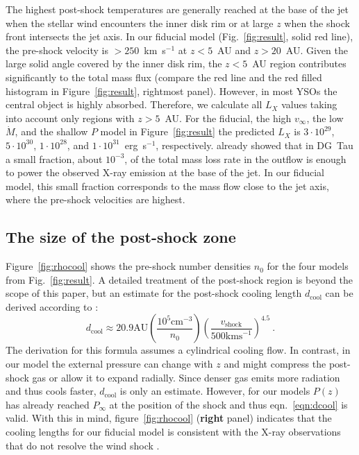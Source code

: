 \documentclass[manuscript]{aastex}
\begin{document}
The highest post-shock temperatures are generally reached at the base of the jet when the stellar wind encounters the inner disk rim or at large $z$ when the shock front intersects the jet axis. In our fiducial model (Fig.~\ref{fig:result}, solid red line), the pre-shock velocity is $>250$~km~s$^{-1}$ at $z<5$~AU and $z>20$~AU. Given the large solid angle covered by the inner disk rim, the  $z<5$~AU region contributes significantly to the total mass flux (compare the red line and the red filled histogram in Figure~\ref{fig:result}, rightmost panel). However, in most YSOs the central object is highly absorbed. Therefore, we calculate all $L_X$ values taking into account only regions with  $z>5$~AU. For the fiducial, the high $v_\infty$, the low $\dot M$, and the shallow $P$ model in Figure~\ref{fig:result} the predicted $L_X$ is $3\cdot10^{29}$, $5\cdot10^{30}$, $1\cdot10^{28}$, and $1\cdot10^{31}$~erg~s$^{-1}$, respectively.
\citet{2009A&A...493..579G} already showed that in DG~Tau a small fraction, about $10^{-3}$, of the total mass loss rate in the outflow is enough to power the observed X-ray emission at the base of the jet. In our fiducial model, this small fraction corresponds to the mass flow close to the jet axis, where the pre-shock velocities are highest.

\subsection{The size of the post-shock zone}
Figure~\ref{fig:rhocool} shows the pre-shock number densities $n_0$ for the four models from Fig.~\ref{fig:result}. A detailed treatment of the post-shock region is beyond the scope of this paper, but an estimate for the post-shock cooling length $d_{\mathrm{cool}}$ can be derived according to \citet{2002ApJ...576L.149R}:
\begin{equation} \label{eqn:dcool}
d_{\mathrm{cool}} \approx 20.9 \mathrm{ AU}
    \left(\frac{10^5\mathrm{ cm}^{-3}}{n_0}\right)
    \left(\frac{v_{\mathrm{shock}}}{500\mathrm{ km s}^{-1}}\right)^{4.5}\ .
\end{equation}
The derivation for this formula assumes a cylindrical cooling flow. In contrast, in our model the external pressure can change with $z$ and might compress the post-shock gas or allow it to expand radially. Since denser gas emits more radiation and thus cools faster, $d_{\mathrm{cool}}$ is only an estimate. However, for our models $P(z)$ has already reached $P_\infty$ at the position of the shock and thus eqn.~\ref{eqn:dcool} is valid. With this in mind, figure~\ref{fig:rhocool} (\textbf{right} panel) indicates that the cooling lengths for our fiducial model is consistent with the X-ray observations that do not resolve the wind shock \citep{2008A&A...488L..13S}.
\end{document}
